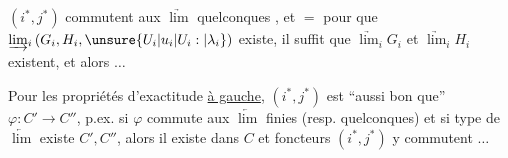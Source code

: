 
\uline{} \((i^*,j^*)\) commutent aux \(\underrightarrow{\lim}\) quelconques , et \(=\) pour que \(\underrightarrow{\lim}_{i}\,(G_i,H_i,\unsure{U_i|u_i|U_i:|\lambda_i})\) existe, il suffit que \(\underrightarrow{\lim}_{i}G_i\) et \(\underrightarrow{\lim}_{i}H_i\) existent, et alors \(\ldots\)

Pour les propriétés d'exactitude \uline{à gauche}, \((i^*,j^*)\) est  ``aussi bon que'' \(\varphi:C'\longrightarrow C''\), p.ex. si \(\varphi\) commute aux \(\underleftarrow{\lim}\) finies (resp. quelconques) et si   type  de \(\underleftarrow{\lim}\) existe  \(C',C''\), alors il existe dans \(C\) et  foncteurs \((i^*,j^*)\) y commutent \(\ldots\)
